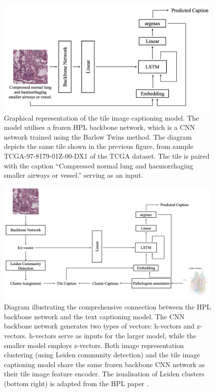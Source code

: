 \documentclass{l4proj}
\begin{document}
\begin{figure}[h!]
    \centering
    \includegraphics[width=1\linewidth]{images/lstm.png}
    \caption{Graphical representation of the tile image captioning model. The model utilises a frozen HPL backbone network, which is a CNN network trained using the Barlow Twins method. The diagram depicts the same tile shown in the previous figure, from sample TCGA-97-8179-01Z-00-DX1 of the TCGA dataset. The tile is paired with the caption ``Compressed normal lung and haemorrhaging smaller airways or vessel.'' serving as an input.}
    \label{fig:lstm-cap}
\end{figure}

\begin{figure}[h!]
    \centering
    \includegraphics[width=1\linewidth]{images/full-work.png}
    \caption{Diagram illustrating the comprehensive connection between the HPL backbone network and the text captioning model. The CNN backbone network generates two types of vectors: h-vectors and z-vectors. h-vectors serve as inputs for the larger model, while the smaller model employs z-vectors. Both image representation clustering (using Leiden community detection) and the tile image captioning model share the same frozen backbone CNN network as their tile image feature encoder. The isualisation of Leiden clusters (bottom right) is adapted from the HPL paper \citep{ClaudioQuiros2024}.}
    \label{fig:workflow-full}
\end{figure}
\clearpage
\end{document}

